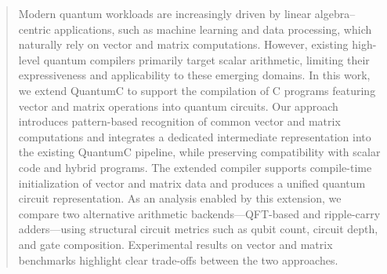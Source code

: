 \begin{abstract}
Modern quantum workloads are increasingly driven by linear algebra--centric applications, such as machine learning and data processing, which naturally rely on vector and matrix computations. However, existing high-level quantum compilers primarily target scalar arithmetic, limiting their expressiveness and applicability to these emerging domains. In this work, we extend QuantumC to support the compilation of C programs featuring vector and matrix operations into quantum circuits. Our approach introduces pattern-based recognition of common vector and matrix computations and integrates a dedicated intermediate representation into the existing QuantumC pipeline, while preserving compatibility with scalar code and hybrid programs. The extended compiler supports compile-time initialization of vector and matrix data and produces a unified quantum circuit representation. As an analysis enabled by this extension, we compare two alternative arithmetic backends---QFT-based and ripple-carry adders---using structural circuit metrics such as qubit count, circuit depth, and gate composition. Experimental results on vector and matrix benchmarks highlight clear trade-offs between the two approaches.
\end{abstract}
